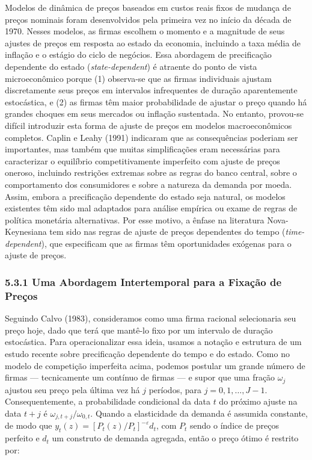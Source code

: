 \documentclass[12pt]{article}
\begin{document}
Modelos de dinâmica de preços baseados em custos reais fixos de mudança de preços nominais foram desenvolvidos pela primeira vez no início da década de 1970. Nesses modelos, as firmas escolhem o momento e a magnitude de seus ajustes de preços em resposta ao estado da economia, incluindo a taxa média de inflação e o estágio do ciclo de negócios. Essa abordagem de precificação dependente do estado (\textit{state-dependent}) é atraente do ponto de vista microeconômico porque (1) observa-se que as firmas individuais ajustam discretamente seus preços em intervalos infrequentes de duração aparentemente estocástica, e (2) as firmas têm maior probabilidade de ajustar o preço quando há grandes choques em seus mercados ou inflação sustentada. No entanto, provou-se difícil introduzir esta forma de ajuste de preços em modelos macroeconômicos completos. Caplin e Leahy (1991) indicaram que as consequências poderiam ser importantes, mas também que muitas simplificações eram necessárias para caracterizar o equilíbrio competitivamente imperfeito com ajuste de preços oneroso, incluindo restrições extremas sobre as regras do banco central, sobre o comportamento dos consumidores e sobre a natureza da demanda por moeda. Assim, embora a precificação dependente do estado seja natural, os modelos existentes têm sido mal adaptados para análise empírica ou exame de regras de política monetária alternativas. Por esse motivo, a ênfase na literatura Nova-Keynesiana tem sido nas regras de ajuste de preços dependentes do tempo (\textit{time-dependent}), que especificam que as firmas têm oportunidades exógenas para o ajuste de preços.

\subsubsection{5.3.1 Uma Abordagem Intertemporal para a Fixação de Preços} Seguindo Calvo (1983), consideramos como uma firma racional selecionaria seu preço hoje, dado que terá que mantê-lo fixo por um intervalo de duração estocástica. Para operacionalizar essa ideia, usamos a notação e estrutura de um estudo recente sobre precificação dependente do tempo e do estado. Como no modelo de competição imperfeita acima, podemos postular um grande número de firmas — tecnicamente um contínuo de firmas — e supor que uma fração $\omega_j$ ajustou seu preço pela última vez há $j$ períodos, para $j = 0, 1, \dots, J-1$. Consequentemente, a probabilidade condicional da data $t$ do próximo ajuste na data $t+j$ é $\omega_{j, t+j}/\omega_{0,t}$. Quando a elasticidade da demanda é assumida constante, de modo que $y_t(z) = [P_t(z)/P_t]^{-\varepsilon} d_t$, com $P_t$ sendo o índice de preços perfeito e $d_t$ um construto de demanda agregada, então o preço ótimo é restrito por:
\end{document}
